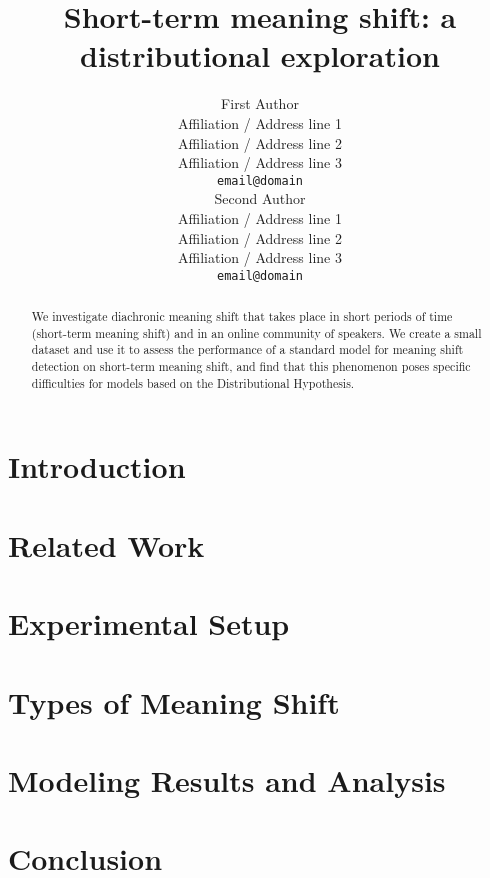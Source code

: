 \documentclass[11pt,a4paper]{article}
\title{Short-term meaning shift: a distributional exploration}
\author{First Author \\
  Affiliation / Address line 1 \\
  Affiliation / Address line 2 \\
  Affiliation / Address line 3 \\
  {\tt email@domain} \\\And
  Second Author \\
  Affiliation / Address line 1 \\
  Affiliation / Address line 2 \\
  Affiliation / Address line 3 \\
  {\tt email@domain} \\}
\date{}
\begin{document}
\maketitle
\begin{abstract}
We investigate diachronic meaning shift that takes place in short periods of time (short-term meaning shift) and in an online community of speakers. We create a small dataset and use it to assess the performance of a standard model for meaning shift detection on short-term meaning shift, and find that this phenomenon poses specific difficulties for models based on the Distributional Hypothesis. 
\end{abstract}

\section{Introduction}
\label{sect:Introduction}


 
\section{Related Work}
\label{sect:Related_Work}



\section{Experimental Setup}
\label{sec:setup}



\section{Types of Meaning Shift}
\label{sec:types}



\section{Modeling Results and Analysis}
\label{sect:results}



\section{Conclusion}
\label{sect:conc}






\end{document}
